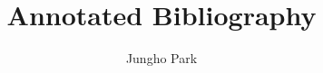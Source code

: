 \documentclass[12pt]{article}
\title{\textbf{Annotated Bibliography}}
\author{Jungho Park}
\begin{document}
\maketitle

\nocite{*}



\end{document}
